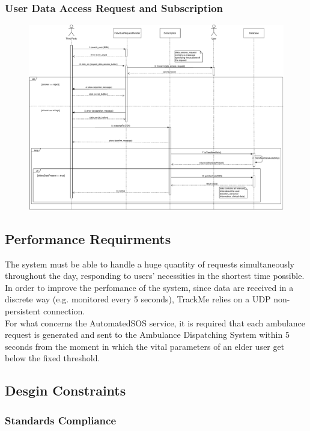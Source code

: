 \documentclass[12pt,a4paper]{article}
\begin{document}
		\subsubsection{User Data Access Request and Subscription}
		\begin{figure}[H]
			\centering
			\includegraphics[width=1.25\linewidth]{Images/request_subscription_sequence}
			\label{fig:request_subscription_sequence}
		\end{figure}

	\subsection{Performance Requirments}
	The system must be able to handle a huge quantity of requests simultaneously throughout the day, responding to users' necessities in the shortest time possible. In order to improve the perfomance of the system, since data are received in a discrete way (e.g. monitored every 5 seconds), TrackMe relies on a UDP non-persistent connection.\\
	For what concerns the AutomatedSOS service, it is required that each ambulance request is generated and sent to the Ambulance Dispatching System within 5 seconds from the moment in which the vital parameters of an elder user get below the fixed threshold.

	\subsection{Desgin Constraints}
	\subsubsection{Standards Compliance}
\end{document}
